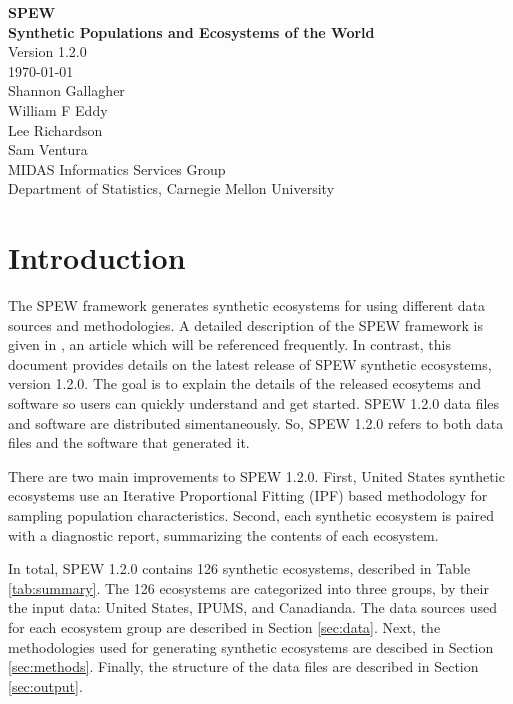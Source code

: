 \documentclass{article}
\begin{document}
\begin{center}
\large{{\bf SPEW \\ Synthetic Populations and Ecosystems of the World}} \\ 
\vspace {2ex}
\large{Version 1.2.0} \\
\vspace{2ex}
\today \\
\vspace{2ex}
\large{Shannon Gallagher} \\
\large{William F Eddy} \\
\large{Lee Richardson} \\	
\large{Sam Ventura} \\
\vspace{5ex}
\large{MIDAS Informatics Services Group} \\
\vspace{2ex}
\large{Department of Statistics, Carnegie Mellon University}
\end{center}

\newpage 

\tableofcontents

\newpage 
\section{Introduction}
\label{sec:intro}
The SPEW framework generates synthetic ecosystems for using different data sources and methodologies. A detailed description of the SPEW framework is given in \cite{spew}, an article which will be referenced frequently. In contrast, this document provides details on the latest release of SPEW synthetic ecosystems, version 1.2.0. The goal is to explain the details of the released ecosytems and software so users can quickly understand and get started. SPEW 1.2.0 data files and software are distributed simentaneously. So, SPEW 1.2.0 refers to both data files and the software that generated it. 

There are two main improvements to SPEW 1.2.0. First, United States synthetic ecosystems use an Iterative Proportional Fitting (IPF) based methodology for sampling population characteristics. Second, each synthetic ecosystem is paired with a diagnostic report, summarizing the contents of each ecosystem. 

In total, SPEW 1.2.0 contains 126 synthetic ecosystems, described in Table \ref{tab:summary}. The 126 ecosystems are categorized into three groups, by their the input data: United States, IPUMS, and Canadianda. The data sources used for each ecosystem group are described in Section \ref{sec:data}. Next, the methodologies used for generating synthetic ecosystems are descibed in Section \ref{sec:methods}. Finally, the structure of the data files are described in Section \ref{sec:output}.
\end{document}
